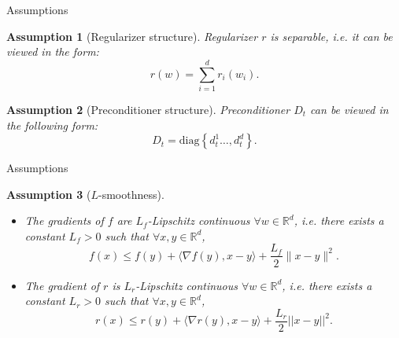 \documentclass[aspectratio=169, 12pt]{beamer}
\newtheorem{assumption}{Assumption}
\begin{document}
\begin{frame}{Assumptions}

\begin{assumption}[Regularizer structure]
    \label{ass:regstruct}
    Regularizer $r$ is separable, i.e. it can be viewed in the form:
    $$r(w) = \sum_{i=1}^d r_i(w_i).$$
\end{assumption}

\begin{assumption}[Preconditioner structure]
    \label{ass:precondstruct}
    Preconditioner $D_t$ can be viewed in the following form:
    \begin{equation*}
         D_t = \textrm{diag} \left\{ d_t^1 \ldots, d
_t^d \right\}.\end{equation*}
\end{assumption}
\end{frame}

\begin{frame}{Assumptions}
    \begin{assumption}[$L$-smoothness]
\label{ass:smoothness}
\begin{itemize}
    \item 	The gradients of $f$ are $L_f$-Lipschitz continuous $\forall w \in \mathbb{R}^d$, i.e. there exists a constant $L_f > 0$ such that $\forall x, y \in \mathbb{R}^d$,
    	\begin{equation*}
    		f(x) \leq f(y) + \langle \nabla f(y), x-y \rangle + \frac{L_f}{2} \|x - y\|^2.
    	\end{equation*}
    \item    The gradient of $r$ is $L_r$-Lipschitz continuous $\forall w \in \mathbb{R}^d$, i.e. there exists a constant $L_r > 0$ such that $\forall x, y \in \mathbb{R}^d$,
	\begin{equation*}
		r(x) \leq r(y) + \langle \nabla r(y), x-y \rangle + \frac{L_r}{2} ||x - y||^2.
	\end{equation*}
\end{itemize}
\end{assumption}
\end{frame}
\end{document}
